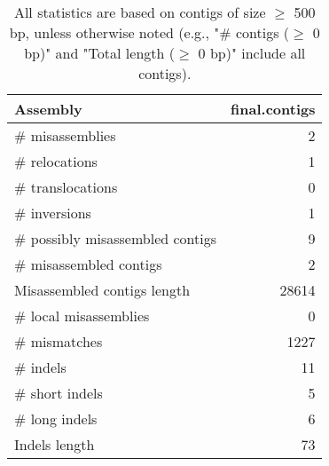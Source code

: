 \documentclass[12pt,a4paper]{article}
\begin{document}
\begin{table}[ht]
\begin{center}
\caption{All statistics are based on contigs of size $\geq$ 500 bp, unless otherwise noted (e.g., "\# contigs ($\geq$ 0 bp)" and "Total length ($\geq$ 0 bp)" include all contigs).}
\begin{tabular}{|l*{1}{|r}|}
\hline
Assembly & final.contigs \\ \hline
\# misassemblies & 2 \\ \hline
\hspace{5mm}\# relocations & 1 \\ \hline
\hspace{5mm}\# translocations & 0 \\ \hline
\hspace{5mm}\# inversions & 1 \\ \hline
\# possibly misassembled contigs & 9 \\ \hline
\# misassembled contigs & 2 \\ \hline
Misassembled contigs length & 28614 \\ \hline
\# local misassemblies & 0 \\ \hline
\# mismatches & 1227 \\ \hline
\# indels & 11 \\ \hline
\hspace{5mm}\# short indels & 5 \\ \hline
\hspace{5mm}\# long indels & 6 \\ \hline
Indels length & 73 \\ \hline
\end{tabular}
\end{center}
\end{table}
\end{document}
